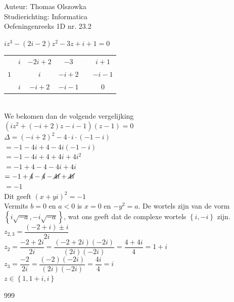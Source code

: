 \documentclass[a4paper]{article}
\begin{document}
  
\noindent \large Auteur: Thomas Olszowka \\
\noindent \large Studierichting: Informatica \\
\noindent \large Oefeningenreeks 1D nr. 23.2 \\

\medskip

\normalsize

$iz^3 -(2i - 2)z^2 -3z + i + 1 = 0$\\

\begin{tabular}{c|ccccc}
     & $i$ & $-2i + 2$ & $-3$ & \vline & $i + 1$  \\
     $1$ &  & $i$ & $-i + 2$ & \vline & $-i -1$ \\ \hline
     & $i$ & $-i + 2$ & $-i - 1$ & \vline & $0$ \\
\end{tabular}\\

We bekomen dan de volgende vergelijking $(iz^2 + (-i + 2)z - i - 1)(z-1) = 0$\\

$\Delta = (-i + 2)^2 - 4\cdot i \cdot (-1 -i)$ \\
    
$= -1 - 4i + 4 - 4i(-1 - i)$ \\
    
$= -1 -4i + 4 + 4i + 4i^2$ \\

$= -1 + 4 - 4 - 4i + 4i$ \\
    
$= -1 +\cancel{4} -\cancel{4} -\cancel{4i} +\cancel{4i}$ \\

$= -1$ \\

Dit geeft $(x + yi)^2 = -1$ \\

Vermits $b = 0$ en $a < 0$ is $x = 0$ en $-y^2 = a$. De wortels zijn van de vorm $\left\{i\sqrt{-a}, -i\sqrt{-a} \right\} $, wat ons geeft dat de complexe wortels $\left\{ i, -i \right\}$ zijn.\\

$z_{2,3} = \dfrac{(-2 + i) \pm i}{2i}$\\

$z_2 = \dfrac{-2 +2i}{2i} =  \dfrac{(-2 + 2i)(-2i)}{(2i)(-2i)} =\dfrac{4 + 4i}{4} = 1 + i$ \\

$z_3 = \dfrac{-2}{2i} = \dfrac{(-2)(-2i)}{(2i)(-2i)} = \dfrac{4i}{4} = i$ \\

$z \in \left\{1, 1 + i, i \right\}$ \\

\begin{thebibliography}{999}
\end{thebibliography}
\end{document}
